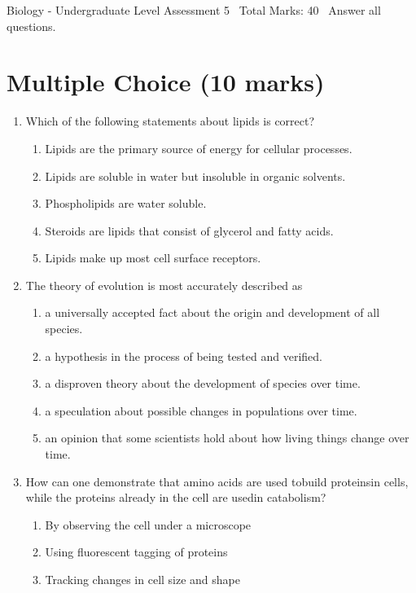 \documentclass[12pt]{article}
\begin{document}
\begin{center}
Biology - Undergraduate Level Assessment 5 \
Total Marks: 40 \
Answer all questions.
\end{center}

\section*{Multiple Choice (10 marks)}
\begin{enumerate}[label=\arabic*.]
\item Which of the following statements about lipids is correct?
\begin{enumerate}[label=(\alph*)]
    \item Lipids are the primary source of energy for cellular processes.
    \item Lipids are soluble in water but insoluble in organic solvents.
    \item Phospholipids are water soluble.
    \item Steroids are lipids that consist of glycerol and fatty acids.
    \item Lipids make up most cell surface receptors.
\end{enumerate}
\item The theory of evolution is most accurately described as
\begin{enumerate}[label=(\alph*)]
    \item a universally accepted fact about the origin and development of all species.
    \item a hypothesis in the process of being tested and verified.
    \item a disproven theory about the development of species over time.
    \item a speculation about possible changes in populations over time.
    \item an opinion that some scientists hold about how living things change over time.
\end{enumerate}
\item How can one demonstrate that amino acids are used tobuild proteinsin cells, while the proteins already in the cell are usedin catabolism?
\begin{enumerate}[label=(\alph*)]
    \item By observing the cell under a microscope
    \item Using fluorescent tagging of proteins
    \item Tracking changes in cell size and shape

\end{enumerate}
\end{enumerate}
\end{document}
